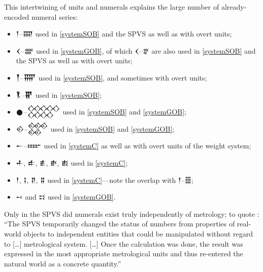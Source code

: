 \documentclass[10pt, a4paper, twoside]{article}
\begin{document}
This intertwining of units and numerals explains the large number of already-encoded numeral series:
\begin{itemize}[nosep]
\item {\xsuxfont 𒁹}–{\xsuxfont 𒐎} used in \ref{systemSOB} and the SPVS as well as with overt units;
\item {\xsuxfont 𒌋}–{\xsuxfont 𒐔} used in \ref{systemGOB}, of which {\xsuxfont 𒌋}–{\xsuxfont 𒐐} are also used in \ref{systemSOB} and the SPVS as well as with overt units;
\item {\xsuxfont 𒐕}–{\xsuxfont 𒐝} used in \ref{systemSOB}, and sometimes with overt units;
\item {\xsuxfont 𒐞}–{\xsuxfont 𒐢} used in \ref{systemSOB};
\item {\xsuxfont 𒊹}–{\xsuxfont 𒐫} used in \ref{systemSOB} and \ref{systemGOB};
\item {\xsuxfont 𒐬}–{\xsuxfont 𒐱} used in \ref{systemSOB} and \ref{systemGOB};
\item {\xsuxfont 𒀸}–{\xsuxfont 𒐇} used in \ref{systemC} as well as with overt units of the weight system;
\item {\xsuxfont 𒑏}, {\xsuxfont 𒑐}, {\xsuxfont 𒑑}, {\xsuxfont 𒑒}, {\xsuxfont 𒑔} used in \ref{systemC};
\item {\xsuxfont 𒁹}, {\xsuxfont 𒑖}, {\xsuxfont 𒑗}, {\xsuxfont 𒐉} used in \ref{systemC}—note the overlap with {\xsuxfont 𒁹}–{\xsuxfont 𒑆};
\item {\xsuxfont 𒑘} and 	{\xsuxfont 𒑙} used in \ref{systemGOB}.
\end{itemize}
Only in the SPVS did numerals exist truly independently of metrology; to quote \cite[78]{Robson2008}:
``The SPVS temporarily changed the status of numbers from properties of real-world objects to independent entities that could be manipulated without regard to […] metrological system. […] Once the calculation was done, the result was expressed in the most appropriate metrological units and thus re-entered the natural world as a concrete quantity.''
\end{document}

